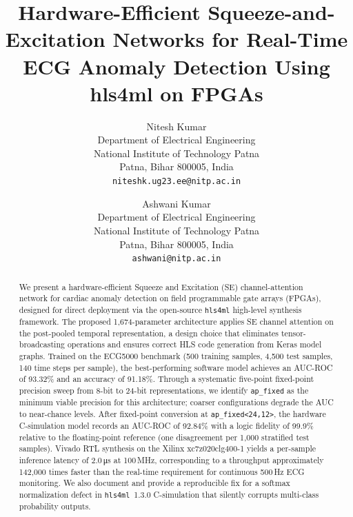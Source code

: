 \documentclass[12pt, letterpaper]{article}
\begin{document}
\title{%
  \textbf{Hardware-Efficient Squeeze-and-Excitation Networks for Real-Time ECG Anomaly Detection Using hls4ml on FPGAs}%
}

\author{%
  Nitesh Kumar\\
  \normalsize Department of Electrical Engineering\\
  \normalsize National Institute of Technology Patna\\
  \normalsize Patna, Bihar 800005, India\\
  \small\texttt{niteshk.ug23.ee@nitp.ac.in}
  \and
  Ashwani Kumar\\
  \normalsize Department of Electrical Engineering\\
  \normalsize National Institute of Technology Patna\\
  \normalsize Patna, Bihar 800005, India\\
  \small\texttt{ashwani@nitp.ac.in}
}

\date{} %

\maketitle

\begin{abstract}
We present a hardware-efficient Squeeze and Excitation (SE)
channel-attention network for cardiac anomaly detection on
field programmable gate arrays (FPGAs), designed 
for direct deployment via the open-source \texttt{hls4ml} high-level synthesis framework. The proposed 1,674-parameter architecture applies SE channel
attention on the post-pooled temporal representation, a design choice
that eliminates tensor-broadcasting operations and ensures correct HLS
code generation from Keras model graphs.
Trained on the ECG5000
benchmark (500 training samples, 4,500 test samples, 140 time steps per
sample), the best-performing software model achieves an AUC-ROC of
93.32\% and an accuracy of 91.18\%.
Through a systematic five-point fixed-point
precision sweep from 8-bit to 24-bit representations, we identify
\texttt{ap\_fixed} as the minimum viable precision for
this architecture;
coarser configurations degrade the AUC to near-chance
levels. After fixed-point conversion at \texttt{ap\_fixed<24,12>}, the
hardware C-simulation model records an AUC-ROC of 92.84\% with a logic
fidelity of 99.9\% relative to the floating-point reference (one
disagreement per 1,000 stratified test samples).
Vivado RTL synthesis on
the Xilinx xc7z020clg400-1 yields a per-sample inference latency of
2.0\,\si{\micro\second} at 100\,MHz, corresponding to a throughput
approximately 142,000 times faster than the real-time requirement for
continuous 500\,Hz ECG monitoring.
We also document and provide a
reproducible fix for a softmax normalization defect in
\texttt{hls4ml}~1.3.0 C-simulation that silently corrupts multi-class
probability outputs.
\end{abstract}
\end{document}
